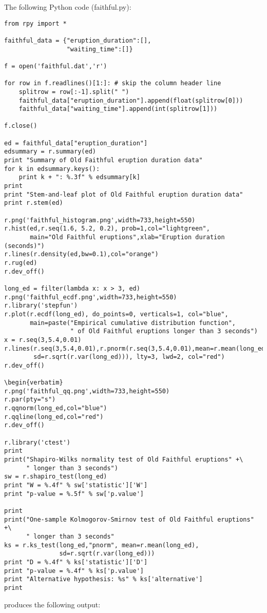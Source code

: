 \documentclass[a4paper,12pt]{article}
\begin{document}
The following Python code (faithful.py):
\begin{verbatim}
from rpy import *

faithful_data = {"eruption_duration":[],
                 "waiting_time":[]}
		
f = open('faithful.dat','r')

for row in f.readlines()[1:]: # skip the column header line
    splitrow = row[:-1].split(" ")
    faithful_data["eruption_duration"].append(float(splitrow[0]))
    faithful_data["waiting_time"].append(int(splitrow[1]))

f.close()

ed = faithful_data["eruption_duration"]
edsummary = r.summary(ed)
print "Summary of Old Faithful eruption duration data"
for k in edsummary.keys():
    print k + ": %.3f" % edsummary[k]
print
print "Stem-and-leaf plot of Old Faithful eruption duration data"
print r.stem(ed)

r.png('faithful_histogram.png',width=733,height=550)
r.hist(ed,r.seq(1.6, 5.2, 0.2), prob=1,col="lightgreen",
       main="Old Faithful eruptions",xlab="Eruption duration (seconds)")
r.lines(r.density(ed,bw=0.1),col="orange")
r.rug(ed)
r.dev_off()

long_ed = filter(lambda x: x > 3, ed)
r.png('faithful_ecdf.png',width=733,height=550)
r.library('stepfun')
r.plot(r.ecdf(long_ed), do_points=0, verticals=1, col="blue",
       main=paste("Empirical cumulative distribution function",
                  " of Old Faithful eruptions longer than 3 seconds")
x = r.seq(3,5.4,0.01)
r.lines(r.seq(3,5.4,0.01),r.pnorm(r.seq(3,5.4,0.01),mean=r.mean(long_ed),
        sd=r.sqrt(r.var(long_ed))), lty=3, lwd=2, col="red")
r.dev_off()

\begin{verbatim}
r.png('faithful_qq.png',width=733,height=550)
r.par(pty="s")
r.qqnorm(long_ed,col="blue")
r.qqline(long_ed,col="red")
r.dev_off()

r.library('ctest')
print
print("Shapiro-Wilks normality test of Old Faithful eruptions" +\
      " longer than 3 seconds")
sw = r.shapiro_test(long_ed)
print "W = %.4f" % sw['statistic']['W']
print "p-value = %.5f" % sw['p.value']

print
print("One-sample Kolmogorov-Smirnov test of Old Faithful eruptions" +\
      " longer than 3 seconds"
ks = r.ks_test(long_ed,"pnorm", mean=r.mean(long_ed),
               sd=r.sqrt(r.var(long_ed)))
print "D = %.4f" % ks['statistic']['D']
print "p-value = %.4f" % ks['p.value']
print "Alternative hypothesis: %s" % ks['alternative']
print
\end{verbatim}
produces the following output:
\end{document}
